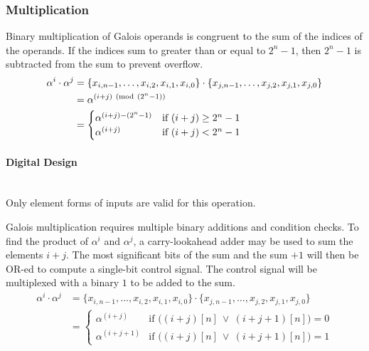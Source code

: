 \subsubsection{Multiplication} Binary multiplication of Galois operands is
congruent to the sum of the indices of the operands. If the indices sum to
greater than or equal to $2^{n}-1$, then $2^{n}-1$ is subtracted from the sum
to prevent overflow.
\begin{align*}
    \alpha^{i} \cdot \alpha^{j} & = \{ x_{i, n-1}, \ldots, x_{i, 2}, x_{i, 1},
    x_{i, 0} \} \cdot \{x_{j, n-1}, \ldots, x_{j, 2}, x_{j, 1}, x_{j, 0}\} \\
    & = \alpha^{(i + j) \ (\mathrm{mod}\ (2^{n}-1))} \\
    & = \begin{cases}
            \alpha^{(i + j) - (2^{n}-1)} & \text{if $(i + j) \geq 2^{n}-1$} \\
            \alpha^{(i + j)} & \text{if $(i + j) < 2^{n}-1$}
        \end{cases}
\end{align*}

    \paragraph{{\small Digital Design}} \leavevmode \\ Only element forms of
    inputs are valid for this operation.

    Galois multiplication requires multiple binary additions and condition
    checks. To find the product of $\alpha^{i}$ and $\alpha^{j}$,
    a carry-lookahead adder may be used to sum the elements $i+j$. The most
    significant bits of the sum and the sum $+1$ will then be OR-ed to compute
    a single-bit control signal. The control signal will be multiplexed with a
    binary $1$ to be added to the sum.
\begin{align*}
    \alpha^{i} \cdot \alpha^{j} & = \{ x_{i, n-1}, \ldots, x_{i, 2}, x_{i, 1},
    x_{i, 0} \} \cdot \{x_{j, n-1}, \ldots, x_{j, 2}, x_{j, 1}, x_{j, 0}\} \\
    & = \begin{cases}
            \alpha^{(i + j)} & \text{if $\Big((i+j)[n] \ \vee \
            (i+j+1)[n]\Big)=0$} \\
            \alpha^{(i + j + 1)} & \text{if $\Big((i+j)[n] \ \vee \
            (i+j+1)[n]\Big)=1$}
        \end{cases}
\end{align*}
